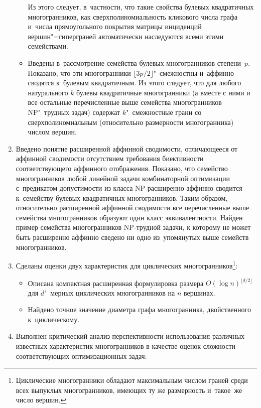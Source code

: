 \begin{enumerate}
\begin{itemize}
	Из этого следует, в~частности, что такие свойства булевых квадратичных многогранников, как сверхполиномиальность кликового числа графа и~числа прямоугольного покрытия матрицы инциденций вершин"=гиперграней автоматически наследуются всеми этими семействами.
	\item Введены в~рассмотрение семейства булевых многогранников степени~$p$.
	Показано, что эти многогранники $\lfloor 3p/2\rfloor$"~смежностны и~аффинно сводятся к~булевым квадратичным. Из этого следует, что для любого натурального $k$ булевы квадратичные многогранники (а вместе с ними и все остальные перечисленные выше семейства многогранников NP"~трудных задач) содержат $k$"~смежностные грани со сверхполиномиальным (относительно размерности многогранника) числом вершин.
\end{itemize}
\item Введено понятие расширенной аффинной сводимости, отличающееся от аффинной сводимости отсутствием требования биективности соответствующего аффинного отображения. Показано, что семейство многогранников любой линейной задачи комбинаторной оптимизации с~предикатом допустимости из класса NP расширенно аффинно сводится к~семейству булевых квадратичных многогранников. 
Таким образом, относительно расширенной аффинной сводимости все перечисленные выше семейства многогранников образуют один класс эквивалентности.
Найден пример семейства многогранников NP-трудной задачи, к которому не может быть расширенно аффинно сведено ни одно из~упомянутых выше семейств многогранников.
\item Сделаны оценки двух характеристик %
для циклических многогранников\footnote{Циклические многогранники обладают максимальным числом граней среди всех выпуклых многогранников, имеющих ту же размерность и~такое~же число вершин.}:
\begin{itemize}
	\item Описана компактная расширенная формулировка размера $O(\log n)^{\lfloor d/2 \rfloor}$ для $d$"~мерных циклических многогранников на $n$ вершинах.
	\item Найдено точное значение диаметра графа многогранника, двойственного к~циклическому.
\end{itemize}
\item Выполнен критический анализ перспективности использования различных известных характеристик многогранников в качестве оценок сложности соответствующих оптимизационных задач:

\end{enumerate}
